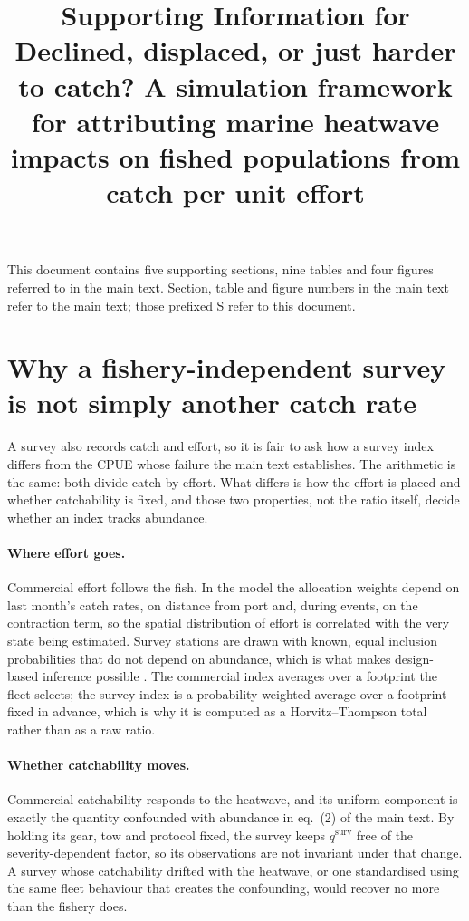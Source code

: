 \documentclass[11pt,a4paper]{article}
\title{Supporting Information for\\ \large Declined, displaced, or just harder to catch? A simulation framework for attributing marine heatwave impacts on fished populations from catch per unit effort}
\author{}
\date{}
\newcommand{\vt}[1]{\text{#1}}
\begin{document}
\maketitle

\noindent This document contains five supporting sections, nine tables and four figures referred to in the main text. Section, table and figure numbers in the main text refer to the main text; those prefixed S refer to this document.

\section{Why a fishery-independent survey is not simply another catch rate}
\label{sec:why-survey}

A survey also records catch and effort, so it is fair to ask how a survey index differs from the CPUE whose failure the main text establishes. The arithmetic is the same: both divide catch by effort. What differs is how the effort is placed and whether catchability is fixed, and those two properties, not the ratio itself, decide whether an index tracks abundance.

\paragraph{Where effort goes.} Commercial effort follows the fish. In the model the allocation weights depend on last month's catch rates, on distance from port and, during events, on the contraction term, so the spatial distribution of effort is correlated with the very state being estimated. Survey stations are drawn with known, equal inclusion probabilities that do not depend on abundance, which is what makes design-based inference possible \citep{sarndal1992}. The commercial index averages over a footprint the fleet selects; the survey index is a probability-weighted average over a footprint fixed in advance, which is why it is computed as a Horvitz--Thompson total \citep{horvitz1952} rather than as a raw ratio.

\paragraph{Whether catchability moves.} Commercial catchability responds to the heatwave, and its uniform component is exactly the quantity confounded with abundance in eq.~(2) of the main text. By holding its gear, tow and protocol fixed, the survey keeps $q^{\vt{surv}}$ free of the severity-dependent factor, so its observations are not invariant under that change. A survey whose catchability drifted with the heatwave, or one standardised using the same fleet behaviour that creates the confounding, would recover no more than the fishery does.
\end{document}
